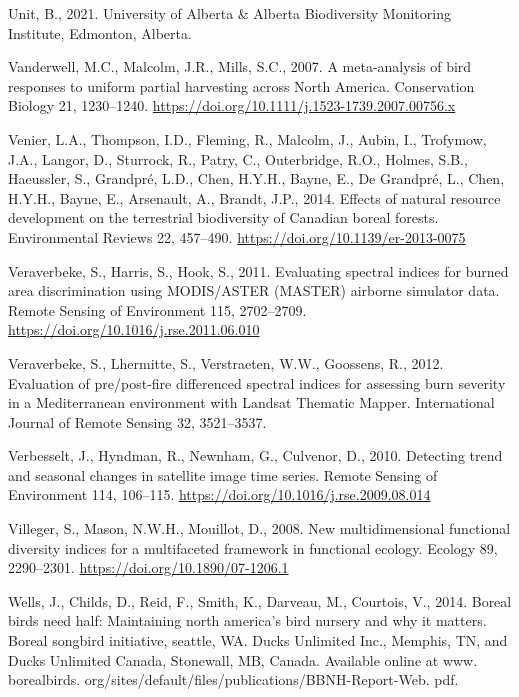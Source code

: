 \documentclass[
  12pt,
]{article}
\newlength{\cslhangindent}
\newlength{\cslentryspacingunit} %
\newenvironment{CSLReferences}[2] %
 {%
  \setlength{\parindent}{0pt}
  \ifodd #1
  \let\oldpar\par
  \def\par{\hangindent=\cslhangindent\oldpar}
  \fi
  \setlength{\parskip}{#2\cslentryspacingunit}
 }%
 {}
\begin{document}
\begin{CSLReferences}{1}{0}
\leavevmode{}%
Unit, B., 2021. University of Alberta \& Alberta Biodiversity Monitoring Institute, Edmonton, Alberta.

\leavevmode{}%
Vanderwell, M.C., Malcolm, J.R., Mills, S.C., 2007. A meta-analysis of bird responses to uniform partial harvesting across {North} {America}. Conservation Biology 21, 1230--1240. \url{https://doi.org/10.1111/j.1523-1739.2007.00756.x}

\leavevmode{}%
Venier, L.A., Thompson, I.D., Fleming, R., Malcolm, J., Aubin, I., Trofymow, J.A., Langor, D., Sturrock, R., Patry, C., Outerbridge, R.O., Holmes, S.B., Haeussler, S., Grandpré, L.D., Chen, H.Y.H., Bayne, E., De Grandpré, L., Chen, H.Y.H., Bayne, E., Arsenault, A., Brandt, J.P., 2014. Effects of natural resource development on the terrestrial biodiversity of {Canadian} boreal forests. Environmental Reviews 22, 457--490. \url{https://doi.org/10.1139/er-2013-0075}

\leavevmode{}%
Veraverbeke, S., Harris, S., Hook, S., 2011. Evaluating spectral indices for burned area discrimination using {MODIS}/{ASTER} ({MASTER}) airborne simulator data. Remote Sensing of Environment 115, 2702--2709. \url{https://doi.org/10.1016/j.rse.2011.06.010}

\leavevmode{}%
Veraverbeke, S., Lhermitte, S., Verstraeten, W.W., Goossens, R., 2012. Evaluation of pre/post-fire differenced spectral indices for assessing burn severity in a {Mediterranean} environment with {Landsat} {Thematic} {Mapper}. International Journal of Remote Sensing 32, 3521--3537.

\leavevmode{}%
Verbesselt, J., Hyndman, R., Newnham, G., Culvenor, D., 2010. Detecting trend and seasonal changes in satellite image time series. Remote Sensing of Environment 114, 106--115. \url{https://doi.org/10.1016/j.rse.2009.08.014}

\leavevmode{}%
Villeger, S., Mason, N.W.H., Mouillot, D., 2008. New multidimensional functional diversity indices for a multifaceted framework in functional ecology. Ecology 89, 2290--2301. \url{https://doi.org/10.1890/07-1206.1}

\leavevmode{}%
Wells, J., Childs, D., Reid, F., Smith, K., Darveau, M., Courtois, V., 2014. Boreal birds need half: {Maintaining} north america's bird nursery and why it matters. {Boreal} songbird initiative, seattle, {WA}. Ducks Unlimited Inc., Memphis, TN, and Ducks Unlimited Canada, Stonewall, MB, Canada. Available online at www. borealbirds. org/sites/default/files/publications/BBNH-Report-Web. pdf.


\end{CSLReferences}
\end{document}
